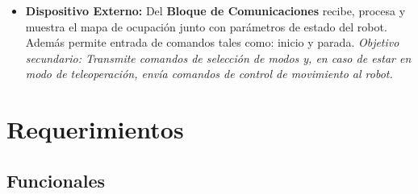 \documentclass[12pt,a4paper]{article}
\begin{document}
\begin{itemize}
    \item \textbf{Dispositivo Externo:} Del \textbf{Bloque de Comunicaciones} recibe, procesa y muestra el mapa de ocupación junto con parámetros de estado del robot. Además permite entrada de comandos tales como: inicio y parada. \textit{Objetivo secundario: Transmite comandos de selección de modos y, en caso de estar en modo de teleoperación, envía comandos de control de movimiento al robot.}
\end{itemize}


\section{Requerimientos}

\subsection{Funcionales}
\end{document}

